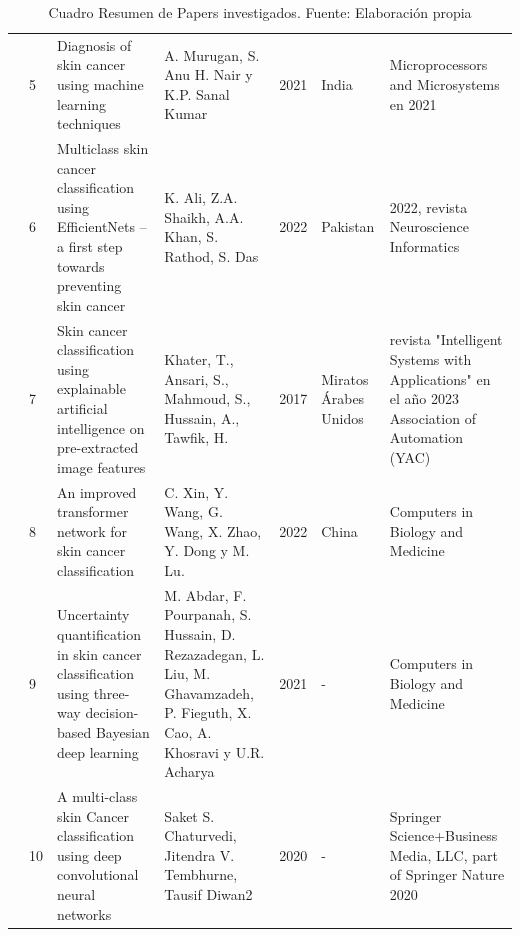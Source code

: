 \begin{table}[h]
\begin{longtable}{|m{0.5cm}|m{0.3cm}|m{4cm}|m{2cm}|m{0.6cm}|m{1.7cm}|m{3cm}|}
	     \hline
		\multirow{4}{*}[-28ex]{\rotcell{\rlap{Técnica}}}                                          
			& 5                                             & Diagnosis of skin cancer using machine learning techniques                                               &A. Murugan, S. Anu H. Nair y K.P. Sanal Kumar & 2021                                        & India                                          & Microprocessors and Microsystems en 2021             \\ 
		\cline{2-7}
		
		
		
		
		& 6                                             & Multiclass skin cancer classification using EfficientNets – a first step towards preventing skin cancer~                   & K. Ali, Z.A. Shaikh, A.A. Khan, S. Rathod, S. Das                                      & 2022                                        & Pakistan                                        & 2022, revista Neuroscience Informatics \\ 
		\cline{2-7}
		& 7                                             & Skin cancer classification using explainable artificial intelligence on pre-extracted image features & Khater, T., Ansari, S., Mahmoud, S., Hussain, A., Tawfik, H. & 2017 & Miratos Árabes Unidos          & revista "Intelligent Systems with Applications" en el año 2023
		Association of Automation (YAC)~              \\ 
		\cline{2-7}
		& 8                                             & An improved transformer network for skin cancer classification
		 &  C. Xin, Y. Wang, G. Wang, X. Zhao, Y. Dong y M. Lu.~             & 2022                                        & China                                          & Computers in Biology and Medicine              \\ 
		\cline{2-7}
		& 9                                             & Uncertainty quantification in skin cancer classification using three-way decision-based Bayesian deep learning                                                                      & M. Abdar, F. Pourpanah, S. Hussain, D. Rezazadegan, L. Liu, M. Ghavamzadeh, P. Fieguth, X. Cao, A. Khosravi y U.R. Acharya                                   & 2021                                        & -                                          & Computers in Biology and Medicine                          \\
		\cline{2-7}
		& 10                                             &A multi-class skin Cancer classification using deep convolutional neural networks    & Saket S. Chaturvedi, Jitendra V. Tembhurne, Tausif Diwan2 & 2020                               & -         & Springer Science+Business Media, LLC, part of Springer Nature 2020 \\
		\hline
	\end{longtable}
	\caption{Cuadro Resumen de Papers investigados. Fuente: Elaboración propia}
\label{A:table}
\end{table}




